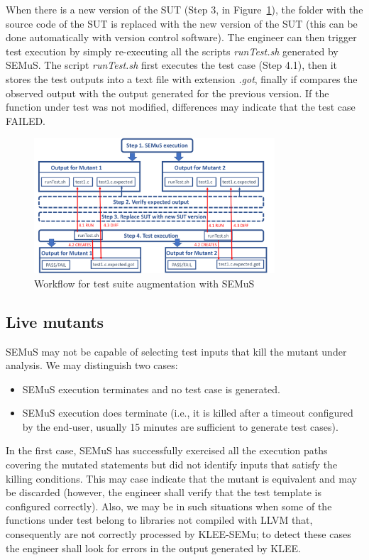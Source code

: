 When there is a new version of the SUT (Step 3, in Figure~\ref{fig:semus:test:example}), the folder with the source code of the SUT is replaced with the new version of the SUT (this can be done automatically with version control software).
The engineer can then trigger test execution by simply re-executing all the scripts \emph{runTest.sh} generated by SEMuS.
The script \emph{runTest.sh} first executes the test case (Step 4.1), then it stores the test outputs into a text file with extension \emph{.got}, finally if compares the observed output with the output generated for the previous version. If the function under test was not modified, differences may indicate that the test case FAILED.

\begin{figure}[h]
\begin{center}
\includegraphics[width=0.8\textwidth]{images/semus-out}
\caption{Workflow for test suite augmentation with SEMuS}
\label{fig:semus:test:example}
\end{center}
\end{figure}

\subsection{Live mutants}

SEMuS may not be capable of selecting test inputs that kill the mutant under analysis. We may distinguish two cases:
\begin{itemize}
\item SEMuS execution terminates and no test case is generated.
\item SEMuS execution does terminate (i.e., it is killed after a timeout configured by the end-user, usually 15 minutes are sufficient to generate test cases).
\end{itemize}

In the first case, SEMuS has successfully exercised all the execution paths covering the mutated statements but did not identify inputs that satisfy the killing conditions. This may case indicate that the mutant is equivalent and may be discarded (however, the engineer shall verify that the test template is configured correctly). Also, we may be in such situations when some of the functions under test belong to libraries not compiled with LLVM that, consequently are not correctly processed by KLEE-SEMu; to detect these cases the engineer shall look for errors in the output generated by KLEE.

